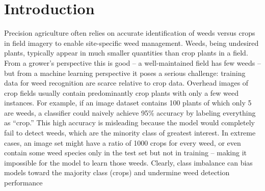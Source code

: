 \documentclass[agriengineering,article,submit,pdftex,moreauthors]{Definitions/mdpi}
\begin{document}
%



%
%
\section{Introduction}
Precision agriculture often relies on accurate identification of weeds versus crops in field imagery to enable site-specific weed management. Weeds, being undesired plants, typically appear in much smaller quantities than crop plants in a field. From a grower’s perspective this is good – a well-maintained field has few weeds – but from a machine learning perspective it poses a serious challenge: training data for weed recognition are scarce relative to crop data. Overhead images of crop fields usually contain predominantly crop plants with only a few weed instances. For example, if an image dataset contains 100 plants of which only 5 are weeds, a classifier could naively achieve 95\% accuracy by labeling everything as “crop.” This high accuracy is misleading because the model would completely fail to detect weeds, which are the minority class of greatest interest. In extreme cases, an image set might have a ratio of 1000 crops for every weed, or even contain some weed species only in the test set but not in training – making it impossible for the model to learn those weeds. Clearly, class imbalance can bias models toward the majority class (crops) and undermine weed detection performance
\end{document}
